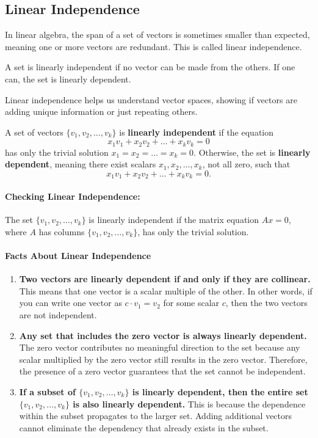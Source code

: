 \documentclass[a4paper,12pt]{article}
\begin{document}
\subsection{Linear Independence}
In linear algebra, the span of a set of vectors is sometimes smaller than expected, meaning one or more vectors are redundant. This is called linear independence.

A set is linearly independent if no vector can be made from the others. If one can, the set is linearly dependent.

Linear independence helps us understand vector spaces, showing if vectors are adding unique information or just repeating others.
\begin{tcolorbox}[title=Definition,colframe=blue!70!black, colback=blue!5!white]
A set of vectors \(\{v_1, v_2, \dots, v_k\}\) is \textbf{linearly independent} if the equation
\[
x_1v_1 + x_2v_2 + \dots + x_kv_k = 0
\]
has only the trivial solution \(x_1 = x_2 = \dots = x_k = 0\). Otherwise, the set is \textbf{linearly dependent}, meaning there exist scalars \(x_1, x_2, \dots, x_k\), not all zero, such that
\[
x_1v_1 + x_2v_2 + \dots + x_kv_k = 0.
\]
\end{tcolorbox}
\paragraph{Checking Linear Independence:}  
The set \(\{v_1, v_2, \dots, v_k\}\) is linearly independent if the matrix equation \(Ax = 0\), where \(A\) has columns \(\{v_1, v_2, \dots, v_k\}\), has only the trivial solution.
\newpage
\paragraph{Facts About Linear Independence}

\begin{enumerate}
    \item \textbf{Two vectors are linearly dependent if and only if they are collinear.}  
    This means that one vector is a scalar multiple of the other. In other words, if you can write one vector as \( c \cdot v_1 = v_2 \) for some scalar \( c \), then the two vectors are not independent.

    \item \textbf{Any set that includes the zero vector is always linearly dependent.}  
    The zero vector contributes no meaningful direction to the set because any scalar multiplied by the zero vector still results in the zero vector. Therefore, the presence of a zero vector guarantees that the set cannot be independent.

    \item \textbf{If a subset of \(\{v_1, v_2, \dots, v_k\}\) is linearly dependent, then the entire set \(\{v_1, v_2, \dots, v_k\}\) is also linearly dependent.}  
    This is because the dependence within the subset propagates to the larger set. Adding additional vectors cannot eliminate the dependency that already exists in the subset.
\end{enumerate}
\end{document}

